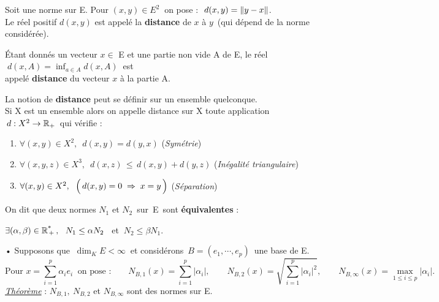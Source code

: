 Soit \normtxt{\ } une norme sur E. Pour \((x,y)\in E^2 \ \) on pose : \(\ d(x,y)=\left\lVert y-x\right\rVert \). \\
Le réel positif \(d(x,y)\) est appelé la \textbf{distance} de \(x\) à \(y\,\) (qui dépend de la norme considérée).

\vspace{1.3cm}

Étant donnés un vecteur \(x\in\) E et une partie non vide A de E, le réel \(\;\displaystyle d(x,A)=\inf _{a\in A} d(x,A)\ \) est\vspace{-0.1cm} \\
appelé \textbf{distance} du vecteur \(x\) à la partie A.

\vspace{1.5cm}

La notion de \textbf{distance} peut se définir sur un ensemble quelconque.\\
Si X est un ensemble alors on appelle distance sur X toute application \(\,d:X^2 \to \mathbb{R}_+\,\) qui vérifie : 
\begin{enumerate}[leftmargin=2cm]
    \item \(\forall(x,y)\in X^2,\ \; d(x,y)=d(y,x)\) \hspace{3.2cm} (\emph{Symétrie})
    
    \item \(\forall (x,y,z)\in X^3,\ \; d(x,z)\,\leq \,d(x,y)+d(y,z)\) \hspace{1cm} (\emph{Inégalité triangulaire})
    
    \item \(\forall (x,y)\in X^2,\ \; \Bigl(\,d(x,y)=0\; \Rightarrow\; x=y\,\Bigr)\) \hspace{1.65cm} (\emph{Séparation})
\end{enumerate}

\vspace{1.2cm}

On dit que deux normes \(N_1\) et \(N_2\,\) sur\, E\, sont \textbf{équivalentes} \ssi :\vspace{-0.15cm}
\begin{center}
    \( \exists (\alpha, \beta) \in \mathbb{R}\textsuperscript{*}\!\!_+\,,\ \ N_1\leq \alpha N_2 \ \,\) et \(\ N_2\leq \beta N_1\).
\end{center}

\newpage

• Supposons que \(\ \dim_KE< \infty \ \) et considérons \(\,B = (e_{1}, \cdots, e_{p})\,\) une base de E.\vspace{-0.2cm}
\[\text{Pour } x=\sum_{i=1}^p \alpha_ie_i \ \text{ on pose :} \qquad N_{B,1}(x) =\sum_{i=1}^p |\alpha_i|, \qquad  N_{B,2}(x) =\sqrt{\sum_{i=1}^p |\alpha_i|^2}, \qquad  N_{B,\infty}(x) =\max _{1\leq i\leq p} |\alpha_i|. \]
\underline{\emph{Théorème}} : \(N_{B,1},\ N_{B,2}\) et \(N_{B,\infty}\) sont des normes sur E.

